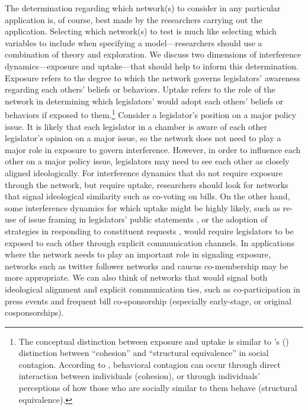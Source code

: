 \documentclass[12pt]{article}
\def\citeapos#1{\citeauthor{#1}'s (\citeyear{#1})}
\begin{document}
The determination regarding which network(s) to consider in any particular application is, of course, best made by the researchers carrying out the application. Selecting which network(s) to test is much like selecting which variables to include when specifying a model---researchers should use a combination of theory and exploration. We discuss two dimensions of interference dynamics---exposure and uptake---that should help to inform this determination. Exposure refers to the degree to which the network governs legislators' awareness regarding each others' beliefs or behaviors. Uptake refers to the role of the network in determining which legislators' would adopt each others' beliefs or behaviors if exposed to them.\footnote{The conceptual distinction between exposure and uptake is similar to \citeapos{burt1987social} distinction between ``cohesion'' and ``structural equivalence'' in social contagion. According to \citet{burt1987social}, behavioral contagion can occur through direct interaction between individuals (cohesion), or through individuals' perceptions of how those who are socially similar to them behave (structural equivalence).} Consider a legislator's position on a major policy issue. It is likely that each legislator in a chamber is aware of each other legislator's opinion on a major issue, so the network does not need to play a major role in exposure to govern interference. However, in order to influence each other on a major policy issue, legislators may need to see each other as closely aligned ideologically. For interference dynamics that do not require exposure through the network, but require uptake, researchers should look for networks that signal ideological similarity such as co-voting on bills. On the other hand, some interference dynamics for which uptake might be highly likely, such as re-use of issue framing in legislators' public statements \citep{lin2016uncovering}, or the adoption of strategies in responding to constituent requests \citep{grose2015explaining}, would require legislators to be exposed to each other through explicit communication channels.  In applications where the network needs to play an important role in signaling exposure, networks such as twitter follower networks and caucus co-membership may be more appropriate. We can also think of networks that would signal both ideological alignment and explicit communication ties, such as co-participation in press events and frequent bill co-sponsorship (especially early-stage, or original cosponsorships).  
\end{document}
